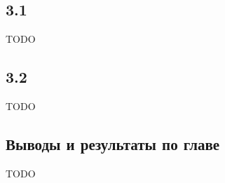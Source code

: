 \documentclass[../diploma.tex]{subfiles}
\begin{document}
\label{sec:3}

\subsection{3.1}

TODO

\subsection{3.2}

TODO

\subsection{Выводы и результаты по главе}

TODO
\end{document}
